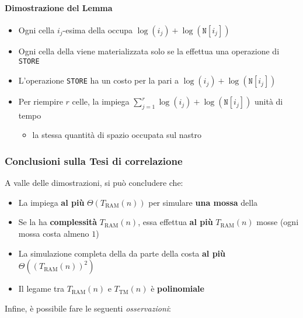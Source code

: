 \documentclass[italian, 10pt]{article}
\begin{document}

\paragraph{Dimostrazione del Lemma}

\begin{itemize}
  \item Ogni cella \(i_j\)-esima della \RAM occupa \(\log{(i_j)} + \log{(\texttt{N}[i_j])}\)
  \item Ogni cella della \RAM viene materializzata solo se la \RAM effettua una operazione di \texttt{STORE}
  \item L'operazione \texttt{STORE} ha un costo per la \RAM pari a \(\log{(i_j)} + \log{(\texttt{N}[i_j])}\)
  \item Per riempire \(r\) celle, la \RAM impiega \(\displaystyle \sum_{j=1}^{r} \log{(i_j)} + \log{(\texttt{N}[i_j])}\) unità di tempo
        \begin{itemize}[label=\(\rightarrow\)]
          \item la stessa quantità di spazio occupata sul nastro
        \end{itemize}
\end{itemize}

\subsubsection{Conclusioni sulla Tesi di correlazione}

A valle delle dimostrazioni, si può concludere che:

\begin{itemize}
  \item La \TM impiega \textbf{al più} \(\Theta(T_\text{RAM}(n))\) per simulare \textbf{una mossa} della \RAM
  \item Se la \RAM ha \textbf{complessità} \(T_\text{RAM}(n)\), essa effettua \textbf{al più} \(T_\text{RAM}(n)\) mosse (ogni mossa costa almeno \(1\))
  \item La simulazione completa della \RAM da parte della \TM costa \textbf{al più} \(\Theta\left((T_\text{RAM}(n))^2\right)\)
  \item Il legame tra \(T_\text{RAM}(n)\) e \(T_\text{TM}(n)\) è \textbf{polinomiale}
\end{itemize}

\bigskip
Infine, è possibile fare le seguenti \textit{osservazioni}:
\end{document}
